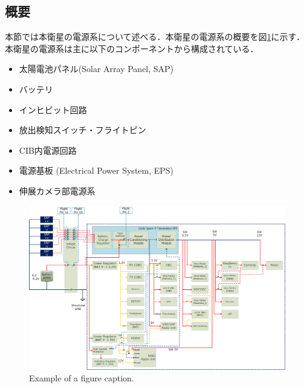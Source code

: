 \subsection{概要}
本節では本衛星の電源系について述べる．本衛星の電源系の概要を図\ref{3_1_power_diagram}に示す．本衛星の電源系は主に以下のコンポーネントから構成されている．
\begin{itemize}
	\item 太陽電池パネル(Solar Array Panel, SAP)
	\item バッテリ
	\item インヒビット回路
	\item 放出検知スイッチ・フライトピン
	\item CIB内電源回路
	\item 電源基板 (Electrical Power System, EPS)
	\item 伸展カメラ部電源系
\end{itemize}


\begin{landscape}
	\begin{figure}[htbp]
		\centering
		\includegraphics[width=0.8\linewidth]{./03/fig/Power_diagram.png}
		\caption{Example of a figure caption.}
		\label{3_1_power_diagram}
	\end{figure}
\end{landscape}    